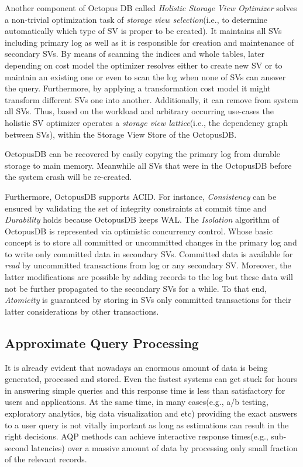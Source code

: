 \documentclass[10pt, conference, compsocconf]{IEEEtran}
\begin{document}
Another component of Octopus DB called \textit{Holistic Storage View Optimizer} solves a non-trivial optimization task of \textit{storage view selection}(i.e., to determine automatically which type of SV is proper to be created). It maintains all SVs including primary log as well as it is responsible for creation and maintenance of secondary SVs. By means of scanning the indices and whole tables, later  depending on cost model the optimizer resolves either to create new SV or to maintain an existing one or even to scan the log when none of SVs can answer the query. Furthermore, by applying a transformation cost model it might transform different SVs one into another. Additionally, it can remove from system all SVs. Thus, based on the workload and arbitrary occurring use-cases the holistic SV optimizer operates a \textit{storage view lattice}(i.e., the dependency graph between SVs), within the Storage View Store of the OctopusDB.

OctopusDB can be recovered by easily copying the primary log from durable storage to main memory. Meanwhile all SVs that were in the OctopusDB before the system crash will be re-created.

Furthermore, OctopusDB supports ACID. For instance, \textit{Consistency} can be ensured by validating the set of integrity constraints at commit time and \textit{Durability} holds because OctopusDB keeps WAL. The \textit{Isolation} algorithm of OctopusDB is represented via optimistic concurrency control. Whose basic concept is to store all committed or uncommitted changes in the primary log and to write only committed data in secondary SVs. Committed data is available for \textit{read} by uncommitted transactions from log or any secondary SV. Moreover, the latter modifications are possible by adding records to the log but these data will not be further propagated to the secondary SVs for a while. To that end, \textit{Atomicity} is guaranteed by storing in SVs only committed transactions for their latter considerations by other transactions.

\subsection{Approximate Query Processing}


It is already evident that nowadays an enormous amount of data is being generated, processed and stored. Even the fastest systems can get stuck for hours in answering simple queries and this response time is less than satisfactory for users and applications. At the same time, in many cases(e.g., a/b testing, exploratory analytics, big data visualization and etc) providing the exact answers to a user query is not vitally important as long as estimations can result in the right decisions. AQP methods can achieve interactive response times(e.g., sub-second latencies) over a massive amount of data by processing only small fraction of the relevant records. 
\end{document}
